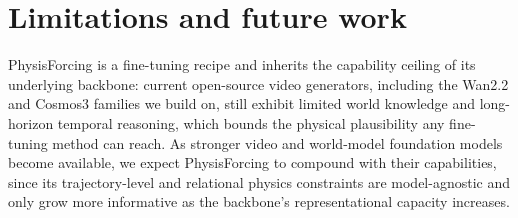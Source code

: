\documentclass{llmxive}
\begin{document}
\section{Limitations and future work}
\label{appx:limitations}

PhysisForcing is a fine-tuning recipe and inherits the capability ceiling of its
underlying backbone: current open-source video generators, including the Wan2.2 and Cosmos3 families
we build on, still exhibit limited world knowledge and long-horizon temporal reasoning,
which bounds the physical plausibility any fine-tuning method can reach. As stronger
video and world-model foundation models become available, we expect PhysisForcing
to compound with their capabilities, since its trajectory-level and relational physics
constraints are model-agnostic and only grow more informative as the backbone's
representational capacity increases.
\end{document}
